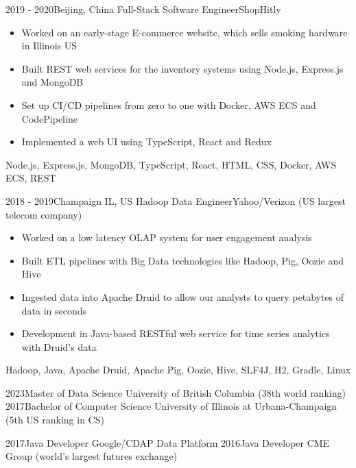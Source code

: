 \documentclass[localFont,alternative]{resume_template}
\begin{document}
\begin{experiences}
    \emptySeparator
    
    \experience
    {2019 - 2020}{Beijing, China}
    {Full-Stack Software Engineer}{ShopHitly}
    {
        \begin{itemize}
        \item Worked on an early-stage E-commerce website, which sells smoking hardware in Illinois US
        \item Built REST web services for the inventory systems using Node.js, Express.js and MongoDB
        \item Set up CI/CD pipelines from zero to one with Docker, AWS ECS and CodePipeline
        \item Implemented a web UI using TypeScript, React and Redux
        \end{itemize}
    }
    {Node.js, Express.js, MongoDB, TypeScript, React, HTML, CSS, Docker, AWS ECS, REST}
    
    \emptySeparator
    
    \experience
    {2018 - 2019}{Champaign IL, US}
    {Hadoop Data Engineer}{Yahoo/Verizon (US largest telecom company)}
    {
        \begin{itemize}
        \item Worked on a low latency OLAP system for user engagement analysis
        \item Built ETL pipelines with Big Data technologies like Hadoop, Pig, Oozie and Hive
        \item Ingested data into Apache Druid to allow our analysts to query petabytes of data in seconds
        \item Development in Java-based RESTful web service for time series analytics with Druid's data
        \end{itemize}
    }
    {Hadoop, Java, Apache Druid, Apache Pig, Oozie, Hive, SLF4J, H2, Gradle, Linux}
    
    \end{experiences}
	
    \twocolumnsection
    {
        \begin{internships}
            \internship
            {2023}{Master of Data Science}
            {University of British Columbia (38th world ranking)}
            \vspace{5pt}
            \internship
            {2017}{Bachelor of Computer Science}
            {University of Illinois at Urbana-Champaign (5th US ranking in CS)}
        \end{internships}
    }
    {
        \begin{internships}
            \internship
            {2017}{Java Developer}
            {Google/CDAP Data Platform}
            \vspace{5pt}
            \internship
            {2016}{Java Developer}
            {CME Group (world's largest futures exchange)}
        \end{internships}
    }
\end{document}
